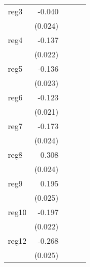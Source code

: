 {\begin{longtable}{l*{4}{D{.}{.}{-1}}}
\addlinespace
reg3        &      -0.040         &                     &                     &                     \\
            &     (0.024)         &                     &                     &                     \\
\addlinespace
reg4        &      -0.137\sym{***}&                     &                     &                     \\
            &     (0.022)         &                     &                     &                     \\
\addlinespace
reg5        &      -0.136\sym{***}&                     &                     &                     \\
            &     (0.023)         &                     &                     &                     \\
\addlinespace
reg6        &      -0.123\sym{***}&                     &                     &                     \\
            &     (0.021)         &                     &                     &                     \\
\addlinespace
reg7        &      -0.173\sym{***}&                     &                     &                     \\
            &     (0.024)         &                     &                     &                     \\
\addlinespace
reg8        &      -0.308\sym{***}&                     &                     &                     \\
            &     (0.024)         &                     &                     &                     \\
\addlinespace
reg9        &       0.195\sym{***}&                     &                     &                     \\
            &     (0.025)         &                     &                     &                     \\
\addlinespace
reg10       &      -0.197\sym{***}&                     &                     &                     \\
            &     (0.022)         &                     &                     &                     \\
\addlinespace
reg12       &      -0.268\sym{***}&                     &                     &                     \\
            &     (0.025)         &                     &                     &                     \\

\end{longtable}}
